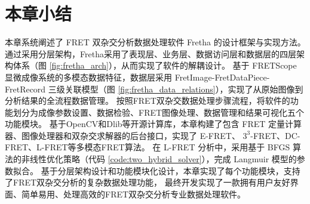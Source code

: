 \section{本章小结}
本章系统阐述了 FRET 双杂交分析数据处理软件 Fretha 的设计框架与实现方法。
通过采用分层架构，Fretha采用了表现层、业务层、数据访问层和数据层的四层架构体系（图 \ref {fig:fretha_arch}），从而实现了软件的解耦设计。
基于 FRETScope 显微成像系统的多模态数据特征，数据层采用 FretImage-FretDataPiece-FretRecord 三级关联模型（图 \ref {fig:fretha_data_relations}），实现了从原始图像到分析结果的全流程数据管理。
按照FRET双杂交数据处理步骤流程，将软件的功能划分为成像参数设置、数据检验、FRET图像处理、数据管理和结果可视化五个功能模块。
基于OpenCV和Dlib等开源计算库，本章构建了包含 FRET 定量计算器、图像处理器和双杂交求解器的后台接口，实现了 E-FRET、 $3^3$-FRET、DC-FRET、L-FRET等多模态FRET算法。
在 L-FRET 分析中，采用基于 BFGS 算法的非线性优化策略（代码 \ref {code:two_hybrid_solver}），完成 Langmuir 模型的参数拟合。
基于分层架构设计和功能模块化设计，本章实现了每个功能模块，支持了FRET双杂交分析的复杂数据处理功能，
最终开发实现了一款拥有用户友好界面、简单易用、处理高效的FRET双杂交分析专业数据处理软件。